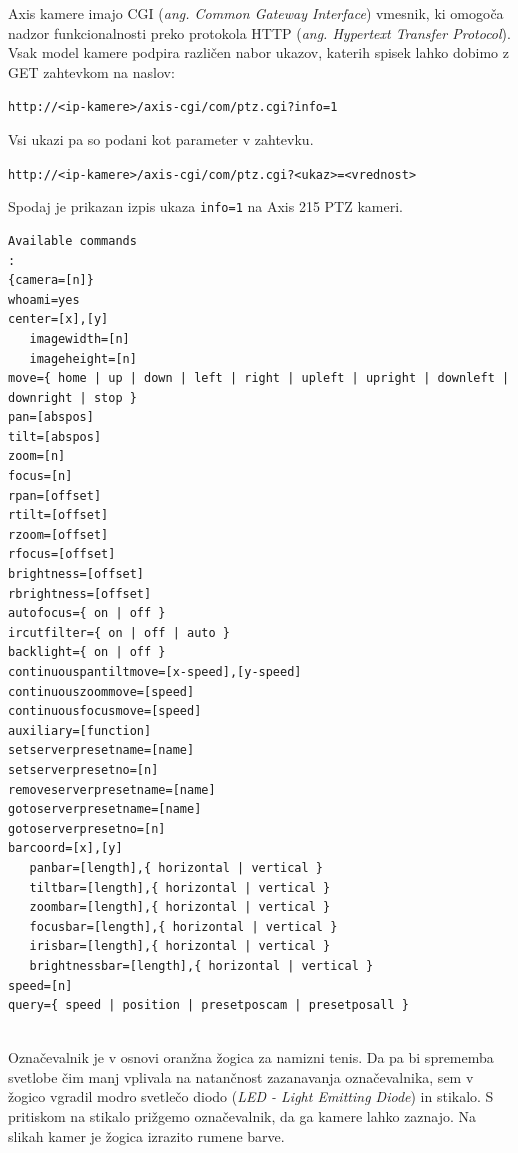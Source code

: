 \documentclass[a4paper, 12pt]{book}
\begin{document}
Axis kamere imajo CGI (\emph{ang. Common Gateway Interface}) vmesnik, ki omogoča nadzor funkcionalnosti preko protokola HTTP (\emph{ang. Hypertext Transfer Protocol}). Vsak model kamere podpira različen nabor ukazov, katerih spisek lahko dobimo z GET zahtevkom na naslov:
\begin{center}
\texttt{http://<ip-kamere>/axis-cgi/com/ptz.cgi?info=1}
\end{center}
Vsi ukazi pa so podani kot parameter v zahtevku.
\begin{center}
\texttt{http://<ip-kamere>/axis-cgi/com/ptz.cgi?<ukaz>=<vrednost>}
\end{center}
Spodaj je prikazan izpis ukaza \texttt{info=1} na Axis 215 PTZ kameri.
\begin{lstlisting}
Available commands
:
{camera=[n]}
whoami=yes
center=[x],[y]
   imagewidth=[n]
   imageheight=[n]
move={ home | up | down | left | right | upleft | upright | downleft | downright | stop }
pan=[abspos]
tilt=[abspos]
zoom=[n]
focus=[n]
rpan=[offset]
rtilt=[offset]
rzoom=[offset]
rfocus=[offset]
brightness=[offset]
rbrightness=[offset]
autofocus={ on | off }
ircutfilter={ on | off | auto }
backlight={ on | off }
continuouspantiltmove=[x-speed],[y-speed]
continuouszoommove=[speed]
continuousfocusmove=[speed]
auxiliary=[function]
setserverpresetname=[name]
setserverpresetno=[n]
removeserverpresetname=[name]
gotoserverpresetname=[name]
gotoserverpresetno=[n]
barcoord=[x],[y]
   panbar=[length],{ horizontal | vertical }
   tiltbar=[length],{ horizontal | vertical }
   zoombar=[length],{ horizontal | vertical }
   focusbar=[length],{ horizontal | vertical }
   irisbar=[length],{ horizontal | vertical }
   brightnessbar=[length],{ horizontal | vertical }
speed=[n]
query={ speed | position | presetposcam | presetposall }
\end{lstlisting}

\vspace{2ex}
 \\
Označevalnik je v osnovi oranžna žogica za namizni tenis. Da pa bi sprememba svetlobe čim manj vplivala na natančnost zazanavanja označevalnika, sem v žogico vgradil modro svetlečo diodo (\emph{LED - Light Emitting Diode}) in stikalo. S pritiskom na stikalo prižgemo označevalnik, da ga kamere lahko zaznajo. Na slikah kamer je žogica izrazito rumene barve.
\end{document}
